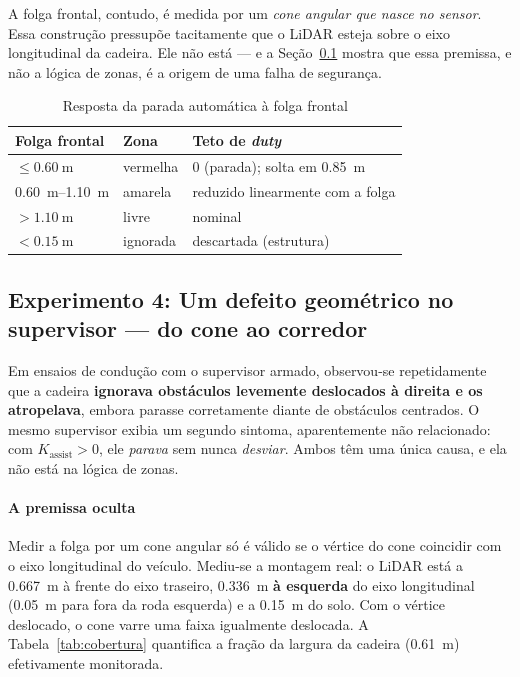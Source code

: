 \documentclass[conference]{IEEEtran}
\begin{document}
A folga frontal, contudo, é medida por um \emph{cone angular que nasce no
sensor}. Essa construção pressupõe tacitamente que o LiDAR esteja sobre o eixo
longitudinal da cadeira. Ele não está --- e a Seção~\ref{sec:corredor} mostra que
essa premissa, e não a lógica de zonas, é a origem de uma falha de segurança.

\begin{table}[!t]
\caption{Resposta da parada automática à folga frontal}
\label{tab:zonas}
\centering
\footnotesize
\renewcommand{\arraystretch}{1.2}
\begin{tabular}{@{}p{}p{}p{}@{}}
\hline
\textbf{Folga frontal} & \textbf{Zona} & \textbf{Teto de \emph{duty}} \\
\hline
$\le \SI{0.60}{\metre}$      & vermelha & $0$ (parada); solta em \SI{0.85}{\metre} \\
\SIrange{0.60}{1.10}{\metre} & amarela  & reduzido linearmente com a folga \\
$> \SI{1.10}{\metre}$        & livre    & nominal \\
$< \SI{0.15}{\metre}$        & ignorada & descartada (estrutura) \\
\hline
\end{tabular}
\end{table}

\subsection{Experimento 4: Um defeito geométrico no supervisor --- do cone ao corredor}
\label{sec:corredor}

Em ensaios de condução com o supervisor armado, observou-se repetidamente que a
cadeira \textbf{ignorava obstáculos levemente deslocados à direita e os
atropelava}, embora parasse corretamente diante de obstáculos centrados. O mesmo
supervisor exibia um segundo sintoma, aparentemente não relacionado: com
$K_{\text{assist}}>0$, ele \emph{parava} sem nunca \emph{desviar}. Ambos têm uma
única causa, e ela não está na lógica de zonas.

\paragraph{A premissa oculta} Medir a folga por um cone angular só é válido se o
vértice do cone coincidir com o eixo longitudinal do veículo. Mediu-se a
montagem real: o LiDAR está a \SI{0.667}{\metre} à frente do eixo traseiro,
\SI{0.336}{\metre} \textbf{à esquerda} do eixo longitudinal (\SI{0.05}{\metre}
para fora da roda esquerda) e a \SI{0.15}{\metre} do solo. Com o vértice
deslocado, o cone varre uma faixa igualmente deslocada. A
Tabela~\ref{tab:cobertura} quantifica a fração da largura da cadeira
(\SI{0.61}{\metre}) efetivamente monitorada.
\end{document}
